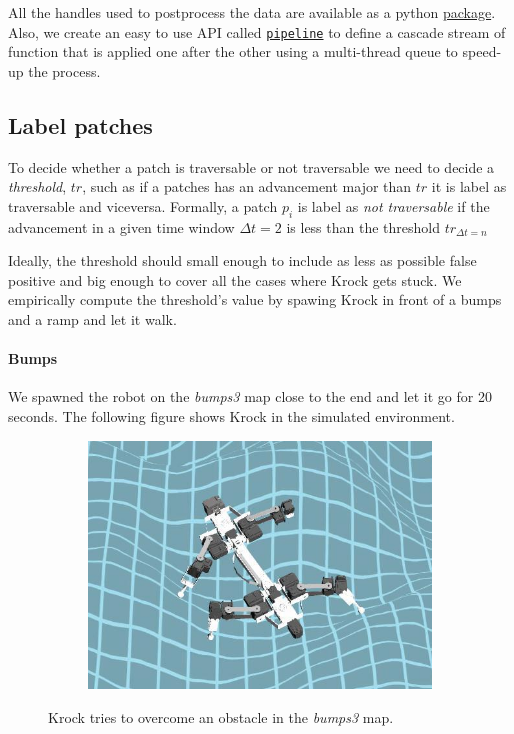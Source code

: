 \documentclass[../document.tex]{subfiles}
\begin{document}
All the handles used to postprocess the data are available as a python \href{https://github.com/FrancescoSaverioZuppichini/Master-Thesis/tree/master/core/utilities/postprocessing/handlers}{package}. Also, we create an easy to use API called \href{https://github.com/FrancescoSaverioZuppichini/Master-Thesis/tree/master/core/utilities/pipeline}{\texttt{pipeline}} to define a cascade stream of function that is applied one after the other using a multi-thread queue to speed-up the process.

\subsection{Label patches}
To decide whether a patch is traversable or not traversable we need to decide a \emph{threshold}, $tr$, such as if a patches has an advancement major than $tr$ it is label as traversable and viceversa. Formally, a patch $p_i$ is label as \emph{not traversable} if the advancement in a given time window $\Delta t = 2$ is less than the threshold $tr_{\Delta t = n}$

Ideally, the threshold should small enough to include as less as possible false positive and big enough to cover all the cases where Krock gets stuck. We empirically compute the threshold's value by spawing Krock in front of a bumps and a ramp and let it walk.
\paragraph{Bumps} We spawned the robot on the \emph{bumps3} map close to the end and let it go for 20 seconds. The following figure shows Krock in the simulated environment.

\begin{figure}[H]
\centering
    \begin{subfigure}[b]{0.45\textwidth}
    \includegraphics[width=\linewidth]{../img/3/find_tr/krock-bumps.jpg}
    \end{subfigure}
\caption{Krock tries to overcome an obstacle in the \emph{bumps3} map.}
\end{figure}
\end{document}
